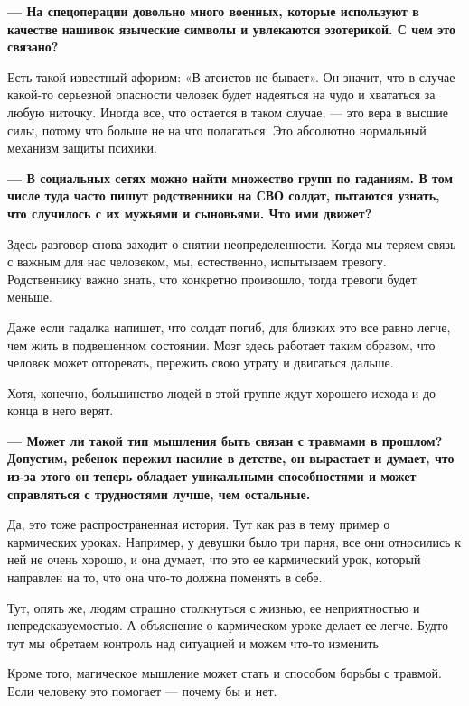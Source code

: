 \textbf{--- На спецоперации довольно много военных, которые используют в качестве нашивок языческие символы и увлекаются эзотерикой. С чем это связано?}

Есть такой известный афоризм: «В  атеистов не бывает». Он значит, что в случае какой-то серьезной опасности человек будет надеяться на чудо и хвататься за любую ниточку. Иногда все, что остается в таком случае, — это вера в высшие силы, потому что больше не на что полагаться. Это абсолютно нормальный механизм защиты психики.

\textbf{--- В социальных сетях можно найти множество групп по гаданиям. В том числе туда часто пишут родственники  на СВО солдат, пытаются узнать, что случилось с их мужьями и сыновьями. Что ими движет? }

Здесь разговор снова заходит о снятии неопределенности. Когда мы теряем связь с важным для нас человеком, мы, естественно, испытываем тревогу. Родственнику важно знать, что конкретно произошло, тогда тревоги будет меньше.

Даже если гадалка напишет, что солдат погиб, для близких это все равно легче, чем жить в подвешенном состоянии. Мозг здесь работает таким образом, что человек может отгоревать, пережить свою утрату и двигаться дальше.

Хотя, конечно, большинство людей в этой группе ждут хорошего исхода и до конца в него верят.

\textbf{--- Может ли такой тип мышления быть связан с травмами в прошлом? Допустим, ребенок пережил насилие в детстве, он вырастает и думает, что из-за этого он теперь обладает уникальными способностями и может справляться с трудностями лучше, чем остальные.}

Да, это тоже распространенная история. Тут как раз в тему пример о кармических уроках. Например, у девушки было три парня, все они относились к ней не очень хорошо, и она думает, что это ее кармический урок, который направлен на то, что она что-то должна поменять в себе.

\begin{fancyquotes}
    Тут, опять же, людям страшно столкнуться с жизнью, ее неприятностью и непредсказуемостью. А объяснение о кармическом уроке делает ее легче. Будто тут мы обретаем контроль над ситуацией и можем что-то изменить
\end{fancyquotes}

Кроме того, магическое мышление может стать и способом борьбы с травмой. Если человеку это помогает — почему бы и нет.


